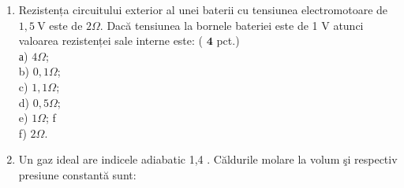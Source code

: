 
\begin{enumerate}
  \item Rezistența circuitului exterior al unei baterii cu tensiunea electromotoare de $1,5 \mathrm{~V}$ este de $2 \Omega$. Dacă tensiunea la bornele bateriei este de 1 V atunci valoarea rezistenței sale interne este: ( $\mathbf{4}$ pct.)\\
а) $4 \Omega$;\\
b) $0,1 \Omega$;\\
c) $1,1 \Omega$;\\
d) $0,5 \Omega$;\\
e) $1 \Omega$; f\\
f) $2 \Omega$.
  \item Un gaz ideal are indicele adiabatic 1,4 . Căldurile molare la volum şi respectiv presiune constantă sunt:
\end{enumerate}


